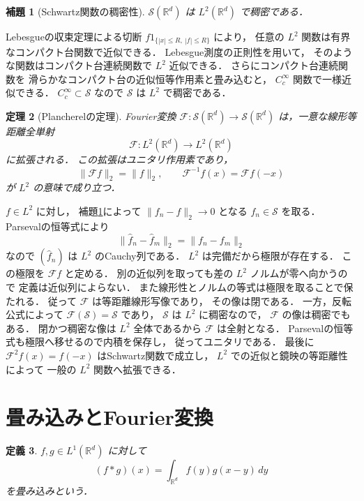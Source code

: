 \documentclass[a5paper,10pt,onecolumn]{jsarticle}
\makeatletter
\theoremstyle{mathnotetheorem}
\newtheorem{theorem}{定理}[section]
\newtheorem{definition}[theorem]{定義}
\newtheorem{lemma}[theorem]{補題}
\renewcommand{\proofname}{証明}
\renewenvironment{proof}[1][\proofname]{%
  \par\pushQED{\qed}\normalfont\topsep4\p@\@plus2\p@\relax
  \trivlist\item[\hskip\labelsep\bfseries #1]\ignorespaces
}{\popQED\endtrivlist\@endpefalse}
\newcommand{\norm}[1]{\lVert #1\rVert}
\makeatother
\begin{document}
\begin{lemma}[Schwartz関数の稠密性]\label{lem:schwartz-dense}
$\mathcal S(\mathbb R^d)$ は $L^2(\mathbb R^d)$ で稠密である．
\end{lemma}
\begin{proof}
Lebesgueの収束定理による切断
$f1_{\{|x|\le R,\ |f|\le R\}}$ により，
任意の $L^2$ 関数は有界なコンパクト台関数で近似できる．
Lebesgue測度の正則性を用いて，
そのような関数はコンパクト台連続関数で
$L^2$ 近似できる．
さらにコンパクト台連続関数を
滑らかなコンパクト台の近似恒等作用素と畳み込むと，
$C_c^\infty$ 関数で一様近似できる．
$C_c^\infty\subset\mathcal S$ なので
$\mathcal S$ は $L^2$ で稠密である．
\end{proof}

\begin{theorem}[Plancherelの定理]\label{thm:plancherel}
Fourier変換
$\mathcal F:\mathcal S(\mathbb R^d)\to\mathcal S(\mathbb R^d)$
は，一意な線形等距離全単射
\[
 \mathcal F:L^2(\mathbb R^d)\to L^2(\mathbb R^d)
\]
に拡張される．
この拡張はユニタリ作用素であり，
\[
 \norm{\mathcal Ff}_2=\norm f_2,\qquad
 \mathcal F^{-1}f(x)=\mathcal Ff(-x)
\]
が $L^2$ の意味で成り立つ．
\end{theorem}
\begin{proof}
$f\in L^2$ に対し，
補題\ref{lem:schwartz-dense}によって
$\norm{f_n-f}_2\to0$ となる
$f_n\in\mathcal S$ を取る．
Parsevalの恒等式により
\[
 \norm{\widehat f_n-\widehat f_m}_2
 =\norm{f_n-f_m}_2
\]
なので $(\widehat f_n)$ は $L^2$ のCauchy列である．
$L^2$ は完備だから極限が存在する．
この極限を $\mathcal Ff$ と定める．
別の近似列を取っても差の $L^2$ ノルムが零へ向かうので
定義は近似列によらない．
また線形性とノルムの等式は極限を取ることで保たれる．
従って $\mathcal F$ は等距離線形写像であり，
その像は閉である．
一方，反転公式によって
$\mathcal F(\mathcal S)=\mathcal S$ であり，
$\mathcal S$ は $L^2$ に稠密なので，
$\mathcal F$ の像は稠密でもある．
閉かつ稠密な像は $L^2$ 全体であるから
$\mathcal F$ は全射となる．
Parsevalの恒等式も極限へ移せるので内積を保存し，
従ってユニタリである．
最後に
$\mathcal F^2f(x)=f(-x)$ はSchwartz関数で成立し，
$L^2$ での近似と鏡映の等距離性によって
一般の $L^2$ 関数へ拡張できる．
\end{proof}

\section{畳み込みとFourier変換}

\begin{definition}
$f,g\in L^1(\mathbb R^d)$ に対して
\[
 (f*g)(x)=\int_{\mathbb R^d}f(y)g(x-y)\,dy
\]
を畳み込みという．
\end{definition}
\end{document}
